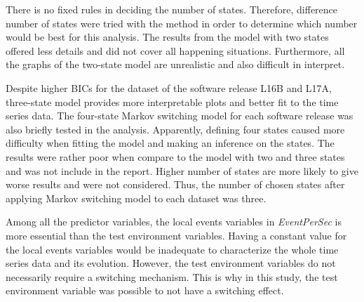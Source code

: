 \begin{comment}
Above all, one has to understand and accept a risk when deciding on
the number of states as there is no guarantee how many states would
yield the best outcome. This risk is also applied to a situation when
determining the number of switching coefficients in the model. 
\end{comment}
There is no fixed rules in deciding the number of states. Therefore,
difference number of states were tried with the method in order to
determine which number would be best for this analysis. The results
from the model with two states offered less details and did not cover
all happening situations. Furthermore, all the graphs of the two-state
model are unrealistic and also difficult in interpret. %
\begin{comment}
had one state with a considerably long period and another state with
a very short period. There is a problematic interpretation when trying
to make a rough inference on the derived states.
\end{comment}
Despite higher BICs for the dataset of the software release L16B and
L17A, three-state model provides more interpretable plots and better
fit to the time series data. The four-state Markov switching model
for each software release was also briefly tested in the analysis.
Apparently, defining four states caused more difficulty when fitting
the model and making an inference on the states. The results were
rather poor when compare to the model with two and three states and
was not include in the report. Higher number of states are more likely
to give worse results and were not considered. Thus, the number of
chosen states after applying Markov switching model to each dataset
was three. 

Among all the predictor variables, the local events variables in \emph{EventPerSec}
is more essential than the test environment variables. Having a constant
value for the local events variables would be inadequate to characterize
the whole time series data and its evolution. However, the test environment
variables do not necessarily require a switching mechanism. This is
why in this study, the test environment variable was possible to not
have a switching effect. %
\begin{comment}
In \ref{sec:Switching}, a hypothesis that the test environment variable
was possible to not have a switching effect was made. 

for each test case and should have flexible values in each of the
fixed number of state. Although these test environment variables affect
the CPU utilization, they do not need to have different values in
each state.
\end{comment}


